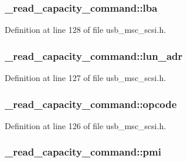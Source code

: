 \subsubsection[{\texorpdfstring{lba}{lba}}]{ \+\_\+read\+\_\+capacity\+\_\+command\+::lba}\hypertarget{struct__read__capacity__command_af0c94df99856ae0ead78159935685767}{}\label{struct__read__capacity__command_af0c94df99856ae0ead78159935685767}


Definition at line 128 of file usb\+\_\+msc\+\_\+scsi.\+h.

\subsubsection[{\texorpdfstring{lun\+\_\+adr}{lun_adr}}]{ \+\_\+read\+\_\+capacity\+\_\+command\+::lun\+\_\+adr}\hypertarget{struct__read__capacity__command_a07f900836b59019ddb9e0ec3da86570f}{}\label{struct__read__capacity__command_a07f900836b59019ddb9e0ec3da86570f}


Definition at line 127 of file usb\+\_\+msc\+\_\+scsi.\+h.

\subsubsection[{\texorpdfstring{opcode}{opcode}}]{ \+\_\+read\+\_\+capacity\+\_\+command\+::opcode}\hypertarget{struct__read__capacity__command_a3944b61382b5de9d96721c4655400281}{}\label{struct__read__capacity__command_a3944b61382b5de9d96721c4655400281}


Definition at line 126 of file usb\+\_\+msc\+\_\+scsi.\+h.

\subsubsection[{\texorpdfstring{pmi}{pmi}}]{ \+\_\+read\+\_\+capacity\+\_\+command\+::pmi}\hypertarget{struct__read__capacity__command_a0b714cbd72937fa715e5e1a838102ed6}{}\label{struct__read__capacity__command_a0b714cbd72937fa715e5e1a838102ed6}


